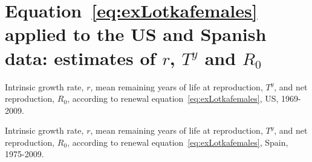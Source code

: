 \chapter{Equation~\ref{eq:exLotkafemales} applied to the US and Spanish data:
estimates of $r$, $T^y$ and $R_0$}
\label{appendix:exlotka1sex}
\begin{table}
\caption{Intrinsic growth rate, $r$, mean remaining years of life at
reproduction, $T^y$, and net reproduction, $R_0$, according to renewal
equation~\ref{eq:exLotkafemales}, US, 1969-2009.}
\label{tab:exRepUS}
\centering
{}
\end{table}

\begin{table}
\caption{Intrinsic growth rate, $r$, mean remaining years of life at
reproduction, $T^y$, and net reproduction, $R_0$, according to renewal
equation~\ref{eq:exLotkafemales}, Spain, 1975-2009.}
\label{tab:exRepUS}
\centering
{}
\end{table}


